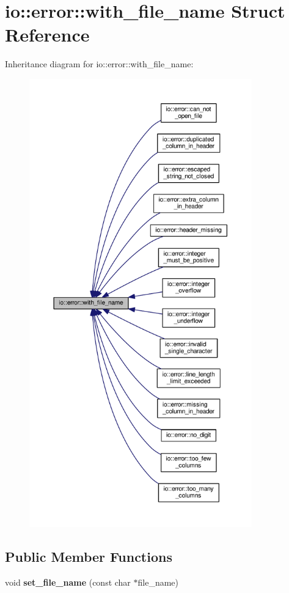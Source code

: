 \section{io\+:\+:error\+:\+:with\+\_\+file\+\_\+name Struct Reference}
\label{structio_1_1error_1_1with__file__name}


Inheritance diagram for io\+:\+:error\+:\+:with\+\_\+file\+\_\+name\+:\nopagebreak
\begin{figure}[H]
\begin{center}
\leavevmode
\includegraphics[height=550pt]{structio_1_1error_1_1with__file__name__inherit__graph}
\end{center}
\end{figure}
\subsection*{Public Member Functions}
\begin{DoxyCompactItemize}
\item 
void {\bfseries set\+\_\+file\+\_\+name} (const char $\ast$file\+\_\+name)\label{structio_1_1error_1_1with__file__name_ae765de62778c989d4658b4efe2995390}

\end{DoxyCompactItemize}
